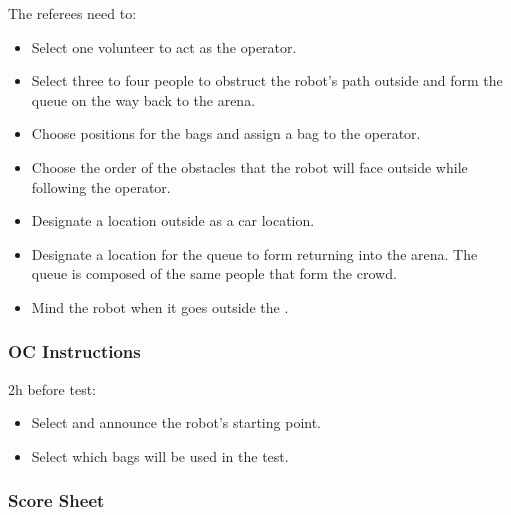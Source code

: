 The referees need to:
\begin{itemize}[nosep]
	\item Select one volunteer to act as the operator.
	\item Select three to four people to obstruct the robot's path outside and form the queue on the way back to the arena.
	\item Choose positions for the bags and assign a bag to the operator.
	\item Choose the order of the obstacles that the robot will face outside while following the operator.
	\item Designate a location outside as a car location.
	\item Designate a location for the queue to form returning into the arena. The queue is composed of the same people that form the crowd.
	\item Mind the robot when it goes outside the \Arena{}.
\end{itemize}

\subsubsection*{OC Instructions}

2h before test:
\begin{itemize}[nosep]
	\item Select and announce the robot's starting point.
	\item Select which bags will be used in the test.
\end{itemize}

\subsubsection*{Score Sheet}
%

